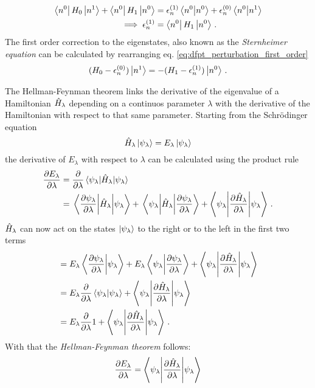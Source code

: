\documentclass[main.tex]{subfiles}
\begin{document}
\begin{align}
    \bra{n^{0}} H_0 \ket{n^{1}} + \bra{n^{0}} H_1 \ket{n^{0}} &= \epsilon_n^{(1)} \bra{n^{0}} \ket{n^{0}} + \epsilon_n^{(0)} \bra{n^{0}} \ket{n^{1}} \\
    \implies \epsilon_n^{(1)} &= \bra{n^{0}} H_1 \ket{n^{0}}\,.
\end{align}
The first order correction to the eigenstates, also known as the \emph{Sternheimer equation} can be calculated by rearranging eq. \ref{eq:dfpt_perturbation_first_order}
\begin{equation}\label{eq:dfpt_sternheimer}
    (H_0 - \epsilon_n^{(0)}) \ket{n^1} = -(H_1 - \epsilon_n^{(1)}) \ket{n^0}\,.
\end{equation}

The Hellman-Feynman theorem \cite{feynman_forces_1939} links the derivative of the eigenvalue of a Hamiltonian \(\hat{H}_{\lambda}\) depending on a continuos parameter \(\lambda\) with the derivative of the Hamiltonian with respect to that same parameter.
Starting from the Schrödinger equation
\begin{equation}
    \hat{H}_{\lambda} \ket{\psi_{\lambda}} = E_{\lambda} \ket{\psi_{\lambda}}
\end{equation}
the derivative of \(E_{\lambda}\) with respect to \(\lambda\) can be calculated using the product rule
\begin{align}
    \pdv{E_{\lambda}}{\lambda} &= \pdv{\lambda} \mel{\psi_{\lambda}}{\hat{H}_{\lambda}}{\psi_{\lambda}} \\
    &= \mel{\pdv{\psi_{\lambda}}{\lambda}}{\hat{H}_{\lambda}}{\psi_{\lambda}} 
    + \mel{\psi_{\lambda}}{\hat{H}_{\lambda}}{\pdv{\psi_{\lambda}}{\lambda}} 
    + \mel**{\psi_{\lambda}}{\pdv{\hat{H}_{\lambda}}{\lambda}}{\psi_{\lambda}}\,.
\end{align}
\(\hat{H}_{\lambda}\) can now act on the states \(\ket{\psi_{\lambda}}\) to the right or to the left in the first two terms
\begin{align}
    &= E_{\lambda} \bra{\pdv{\psi_{\lambda}}{\lambda}}\ket{\psi_{\lambda}}
    + E_{\lambda} \bra{\psi_{\lambda}}\ket{\pdv{\psi_{\lambda}}{\lambda}}
    + \mel**{\psi_{\lambda}}{\pdv{\hat{H}_{\lambda}}{\lambda}}{\psi_{\lambda}} \\
    &= E_{\lambda} \pdv{\lambda} \braket{\psi_{\lambda}}
    + \mel**{\psi_{\lambda}}{\pdv{\hat{H}_{\lambda}}{\lambda}}{\psi_{\lambda}} \\
    &= E_{\lambda} \pdv{\lambda} 1 + \mel**{\psi_{\lambda}}{\pdv{\hat{H}_{\lambda}}{\lambda}}{\psi_{\lambda}}\,.
\end{align}
With that the \emph{Hellman-Feynman theorem} follows:
\begin{equation}\label{eq:dfpt_hellman_feynman}
    \pdv{E_{\lambda}}{\lambda} = \mel**{\psi_{\lambda}}{\pdv{\hat{H}_{\lambda}}{\lambda}}{\psi_{\lambda}}
\end{equation}
\end{document}
